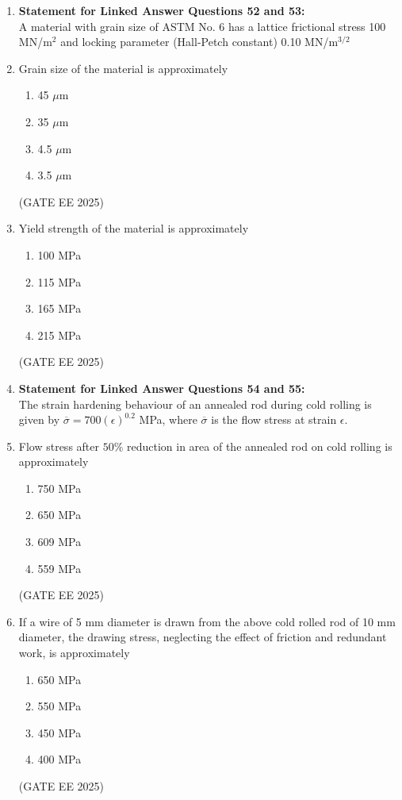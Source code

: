 \documentclass[11pt, letterpaper]{article}
\theoremstyle{remark}
\begin{document}
\begin{enumerate}
\item[] \textbf{Statement for Linked Answer Questions 52 and 53:} \\
A material with grain size of ASTM No. 6 has a lattice frictional stress 100 MN/m$^2$ and locking parameter (Hall-Petch constant) 0.10 MN/m$^{3/2}$

\item Grain size of the material is approximately
\begin{multicols}{2}
\begin{enumerate}  
\item 45 $\mu$m
\item 35 $\mu$m
\item 4.5 $\mu$m
\item 3.5 $\mu$m
\end{enumerate}
\end{multicols}
\hfill(GATE EE 2025)

\item Yield strength of the material is approximately
\begin{multicols}{2}
\begin{enumerate}  
\item 100 MPa
\item 115 MPa
\item 165 MPa
\item 215 MPa
\end{enumerate}
\end{multicols}
\hfill(GATE EE 2025)

\item[] \textbf{Statement for Linked Answer Questions 54 and 55:}\\
The strain hardening behaviour of an annealed rod during cold rolling is given by $\overline{\sigma} = 700(\epsilon)^{0.2}$ MPa, where $\overline{\sigma}$ is the flow stress at strain $\epsilon$.

\item Flow stress after $50\%$ reduction in area of the annealed rod on cold rolling is approximately
\begin{multicols}{2}
\begin{enumerate}  
\item 750 MPa
\item 650 MPa
\item 609 MPa
\item 559 MPa
\end{enumerate}
\end{multicols}
\hfill(GATE EE 2025)

\item If a wire of 5 mm diameter is drawn from the above cold rolled rod of 10 mm diameter, the drawing stress, neglecting the effect of friction and redundant work, is approximately
\begin{multicols}{2}
\begin{enumerate}  
\item 650 MPa
\item 550 MPa
\item 450 MPa
\item 400 MPa
\end{enumerate}
\end{multicols}
\hfill(GATE EE 2025)


\end{enumerate}
\end{document}
